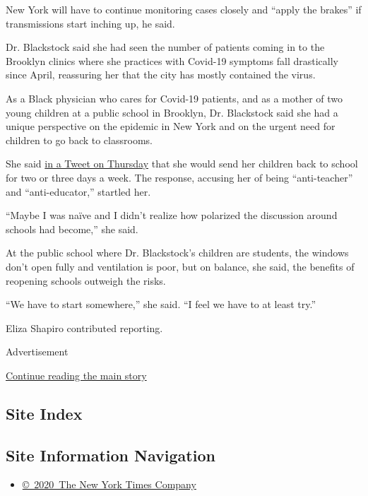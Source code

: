 New York will have to continue monitoring cases closely and ``apply the
brakes'' if transmissions start inching up, he said.

Dr. Blackstock said she had seen the number of patients coming in to the
Brooklyn clinics where she practices with Covid-19 symptoms fall
drastically since April, reassuring her that the city has mostly
contained the virus.

As a Black physician who cares for Covid-19 patients, and as a mother of
two young children at a public school in Brooklyn, Dr. Blackstock said
she had a unique perspective on the epidemic in New York and on the
urgent need for children to go back to classrooms.

She said
\href{https://twitter.com/uche_blackstock/status/1291206051094765569}{in
a Tweet on Thursday} that she would send her children back to school for
two or three days a week. The response, accusing her of being
``anti-teacher'' and ``anti-educator,'' startled her.

``Maybe I was naïve and I didn't realize how polarized the discussion
around schools had become,'' she said.

At the public school where Dr. Blackstock's children are students, the
windows don't open fully and ventilation is poor, but on balance, she
said, the benefits of reopening schools outweigh the risks.

``We have to start somewhere,'' she said. ``I feel we have to at least
try.''

Eliza Shapiro contributed reporting.

Advertisement

\protect\hyperlink{after-bottom}{Continue reading the main story}

\hypertarget{site-index}{%
\subsection{Site Index}\label{site-index}}

\hypertarget{site-information-navigation}{%
\subsection{Site Information
Navigation}\label{site-information-navigation}}

\begin{itemize}
\tightlist
\item
  \href{https://help.nytimes3xbfgragh.onion/hc/en-us/articles/115014792127-Copyright-notice}{©~2020~The
  New York Times Company}
\end{itemize}

